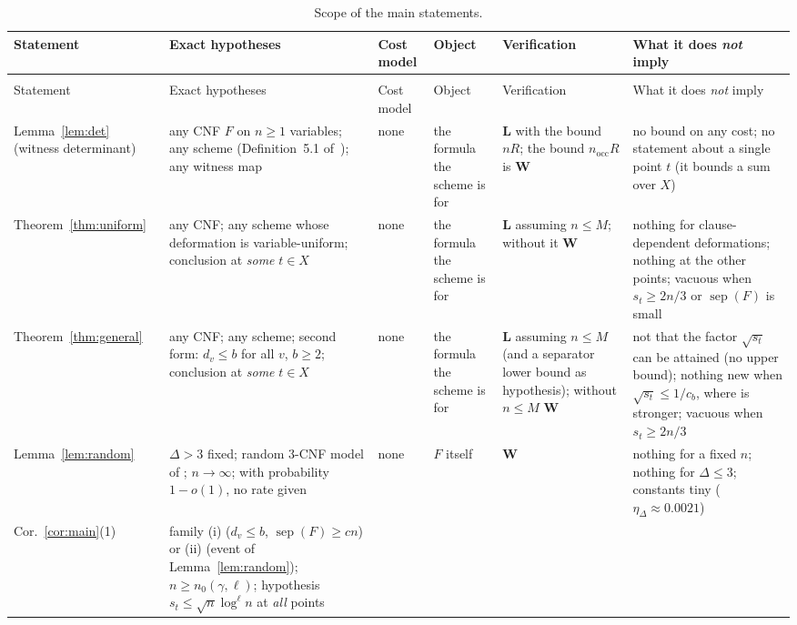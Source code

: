 \documentclass[11pt,a4paper]{article}
\theoremstyle{definition}
\theoremstyle{remark}
\newcommand{\sep}{\operatorname{sep}}
\newcommand{\nocc}{n_{\mathrm{occ}}}
\begin{document}
{\footnotesize
\setlength{\tabcolsep}{3pt}
\begin{longtable}{@{}>{\raggedright\arraybackslash}p{1.9cm}>{\raggedright\arraybackslash}p{3.7cm}>{\raggedright\arraybackslash}p{1.45cm}>{\raggedright\arraybackslash}p{1.6cm}>{\raggedright\arraybackslash}p{1.9cm}>{\raggedright\arraybackslash}p{4.1cm}@{}}
\caption{Scope of the main statements.}\label{tab:scope}\\
\toprule
Statement & Exact hypotheses & Cost model & Object & Verification & What it does \emph{not} imply\\
\midrule
\endfirsthead
\multicolumn{6}{@{}l}{\emph{Table~\ref{tab:scope}, continued}}\\
\toprule
Statement & Exact hypotheses & Cost model & Object & Verification & What it does \emph{not} imply\\
\midrule
\endhead
\bottomrule
\endfoot
Lemma~\ref{lem:det} (witness determinant) &
any CNF $F$ on $n\ge1$ variables; any scheme (Definition~5.1 of~\cite{DL}); any witness map &
none & the formula the scheme is for & \textbf{L} with the bound $nR$; the bound $\nocc R$ is \textbf{W} &
no bound on any cost; no statement about a single point $t$ (it bounds a sum over $X$)\\[3pt]
Theorem~\ref{thm:uniform} &
any CNF; any scheme whose deformation is variable-uniform; conclusion at \emph{some} $t\in X$ &
none & the formula the scheme is for & \textbf{L} assuming $n\le M$; without it \textbf{W} &
nothing for clause-dependent deformations; nothing at the other points; vacuous when $s_t\ge2n/3$ or $\sep(F)$ is small\\[3pt]
Theorem~\ref{thm:general} &
any CNF; any scheme; second form: $d_v\le b$ for all $v$, $b\ge2$; conclusion at \emph{some} $t\in X$ &
none & the formula the scheme is for & \textbf{L} assuming $n\le M$ (and a separator lower bound as hypothesis); without $n\le M$ \textbf{W} &
not that the factor $\sqrt{s_t}$ can be attained (no upper bound); nothing new when $\sqrt{s_t}\le1/c_b$, where \cite[Thm~7.1(ii)]{DL} is stronger; vacuous when $s_t\ge2n/3$\\[3pt]
Lemma~\ref{lem:random} &
$\Delta>3$ fixed; random 3-CNF model of \cite[App.~A]{DL}; $n\to\infty$; with probability $1-o(1)$, no rate given &
none & $F$ itself & \textbf{W} &
nothing for a fixed $n$; nothing for $\Delta\le3$; constants tiny ($\eta_\Delta\approx0.0021$)\\[3pt]
Cor.~\ref{cor:main}(1) &
family (i) ($d_v\le b$, $\sep(F)\ge cn$) or (ii) (event of Lemma~\ref{lem:random}); $n\ge n_0(\gamma,\ell)$; hypothesis $s_t\le\sqrt n\log^\ell n$ at \emph{all} points &

\end{longtable}}
\end{document}
